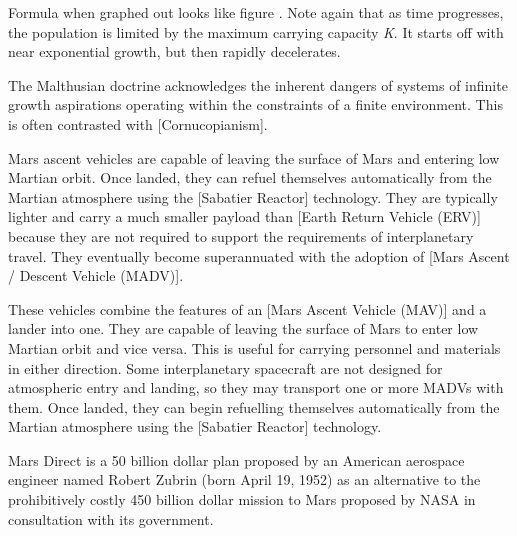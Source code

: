 \startformula
{}
\stopformula
\crlf

Formula  when graphed out looks like figure . Note again that as time progresses, the population is limited by the maximum carrying capacity {\it K}. It starts off with near exponential growth, but then rapidly decelerates.

    {}

The Malthusian doctrine acknowledges the inherent dangers of systems of infinite growth aspirations operating within the constraints of a finite environment. This is often contrasted with [Cornucopianism].
\stopdefinition

Mars ascent vehicles are capable of leaving the surface of Mars and entering low Martian orbit. Once landed, they can refuel themselves automatically from the Martian atmosphere using the [Sabatier Reactor] technology. They are typically lighter and carry a much smaller payload than [Earth Return Vehicle (ERV)] because they are not required to support the requirements of interplanetary travel. They eventually become superannuated with the adoption of [Mars Ascent / Descent Vehicle (MADV)].
\stopdefinition

These vehicles combine the features of an [Mars Ascent Vehicle (MAV)] and a lander into one. They are capable of leaving the surface of Mars to enter low Martian orbit and vice versa. This is useful for carrying personnel and materials in either direction. Some interplanetary spacecraft are not designed for atmospheric entry and landing, so they may transport one or more MADVs with them. Once landed, they can begin refuelling themselves automatically from the Martian atmosphere using the [Sabatier Reactor] technology.
\stopdefinition

Mars Direct is a \type{$}50 billion dollar plan proposed by an American aerospace engineer named Robert Zubrin (born April 19, 1952) as an alternative to the prohibitively costly \type{$}450 billion dollar mission to Mars proposed by NASA in consultation with its government.

